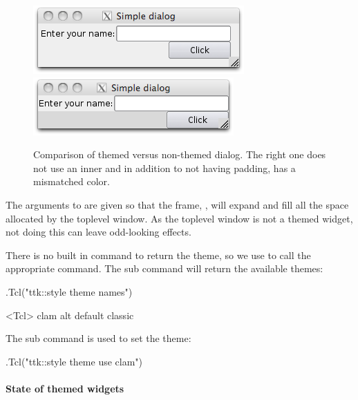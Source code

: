 \begin{figure}
  \centering
    \includegraphics[width=.4\textwidth]{fig-tcltk-themed-dialog.png}
    \includegraphics[width=.4\textwidth]{fig-tcltk-non-themed-dialog.png}
  \caption{Comparison of themed versus non-themed dialog. The right
    one does not use an inner  and in addition to not
    having padding, has a mismatched color.}
  \label{fig:tcltk-compare-themed-non-themed}
\end{figure}


The arguments to  are given so that the frame, ,
will expand and fill all the space allocated by the toplevel
window. As the toplevel window is not a themed widget, not doing this
can leave odd-looking effects.

There is no built in command to return the theme, so we use
 to call the appropriate \TCL\/ command. The 
sub command will return the available themes:

\begin{Schunk}
\begin{Sinput}
 .Tcl("ttk::style theme names")
\end{Sinput}
\begin{Soutput}
<Tcl> clam alt default classic 
\end{Soutput}
\end{Schunk}
%
The  sub command is used to set the theme:
\begin{Schunk}
\begin{Sinput}
 .Tcl("ttk::style theme use clam")
\end{Sinput}
\end{Schunk}

\paragraph{State of themed widgets}

